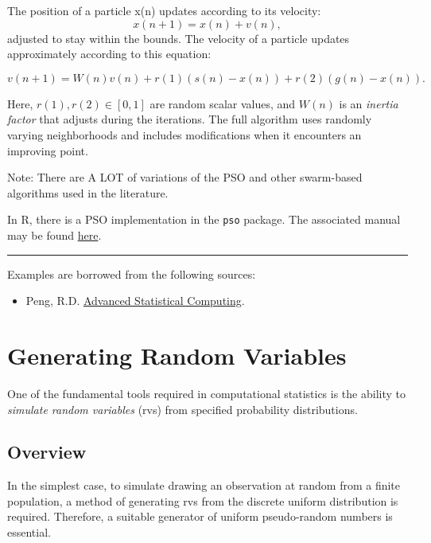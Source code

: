 \documentclass[
  letterpaper,
  DIV=11,
  numbers=noendperiod]{scrreprt}
\providecommand{\tightlist}{%
  \setlength{\itemsep}{0pt}\setlength{\parskip}{0pt}}
\begin{document}
The position of a particle x(n) updates according to its velocity:
\[x(n+1)=x(n)+v(n),\] adjusted to stay within the bounds. The velocity
of a particle updates approximately according to this equation:

\[v(n+1) = W(n)v(n)+r(1)(s(n)−x(n))+r(2)(g(n)−x(n)).\]

Here, \(r(1),r(2) \in [0,1]\) are random scalar values, and \(W(n)\) is
an \emph{inertia factor} that adjusts during the iterations. The full
algorithm uses randomly varying neighborhoods and includes modifications
when it encounters an improving point.

Note: There are A LOT of variations of the PSO and other swarm-based
algorithms used in the literature.

In R, there is a PSO implementation in the \texttt{pso} package. The
associated manual may be found
\href{https://cran.r-project.org/web/packages/pso/pso.pdf}{here}.

\begin{center}\rule{0.5\linewidth}{0.5pt}\end{center}

Examples are borrowed from the following sources:

\begin{itemize}
\tightlist
\item
  Peng, R.D. \href{https://bookdown.org/rdpeng/advstatcomp/}{Advanced
  Statistical Computing}.
\end{itemize}


\chapter{Generating Random Variables}\label{generating-random-variables}

\newcommand{\unif}{\operatorname{Unif}}
\newcommand{\geom}{\operatorname{Geom}}
\newcommand{\beta}{\operatorname{Beta}}

One of the fundamental tools required in computational statistics is the
ability to \emph{simulate random variables} (rvs) from specified
probability distributions.

\section{Overview}\label{overview}

In the simplest case, to simulate drawing an observation at random from
a finite population, a method of generating rvs from the discrete
uniform distribution is required. Therefore, a suitable generator of
uniform pseudo-random numbers is essential.
\end{document}
